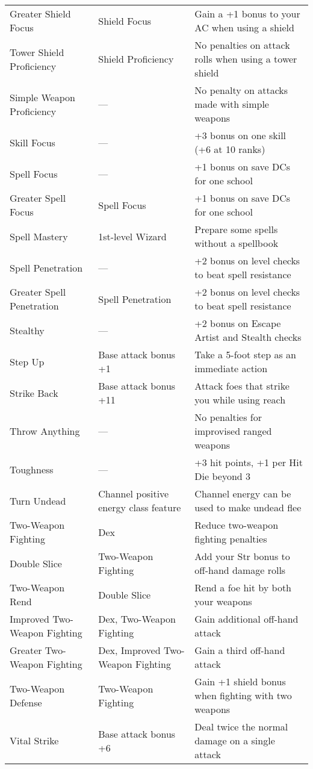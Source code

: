 \begin{table}[]
\begin{tabular}{lll}
\quad \quad Greater Shield Focus & Shield Focus & Gain a +1 bonus to your AC when using a shield\\
\quad Tower Shield Proficiency & Shield Proficiency & No penalties on attack rolls when using a tower shield\\
Simple Weapon Proficiency & — & No penalty on attacks made with simple weapons\\
Skill Focus & — & +3 bonus on one skill (+6 at 10 ranks)\\
Spell Focus & — & +1 bonus on save DCs for one school\\
\quad Greater Spell Focus & Spell Focus & +1 bonus on save DCs for one school\\
Spell Mastery & 1st-level Wizard & Prepare some spells without a spellbook\\
Spell Penetration & — & +2 bonus on level checks to beat spell resistance\\
\quad Greater Spell Penetration & Spell Penetration & +2 bonus on level checks to beat spell resistance\\
Stealthy & — & +2 bonus on Escape Artist and Stealth checks\\
Step Up & Base attack bonus +1 & Take a 5-foot step as an immediate action\\
Strike Back & Base attack bonus +11 & Attack foes that strike you while using reach\\
Throw Anything & — & No penalties for improvised ranged weapons\\
Toughness & — & +3 hit points, +1 per Hit Die beyond 3\\
Turn Undead & Channel positive energy class feature & Channel energy can be used to make undead flee\\
Two-Weapon Fighting & Dex & Reduce two-weapon fighting penalties\\
\quad Double Slice & Two-Weapon Fighting & Add your Str bonus to off-hand damage rolls\\
\quad \quad Two-Weapon Rend & Double Slice & Rend a foe hit by both your weapons\\
\quad Improved Two-Weapon Fighting & Dex, Two-Weapon Fighting & Gain additional off-hand attack\\
\quad \quad Greater Two-Weapon Fighting & Dex, Improved Two-Weapon Fighting & Gain a third off-hand attack\\
\quad Two-Weapon Defense & Two-Weapon Fighting & Gain +1 shield bonus when fighting with two weapons\\
Vital Strike & Base attack bonus +6 & Deal twice the normal damage on a single attack\\

\end{tabular}
\end{table}
